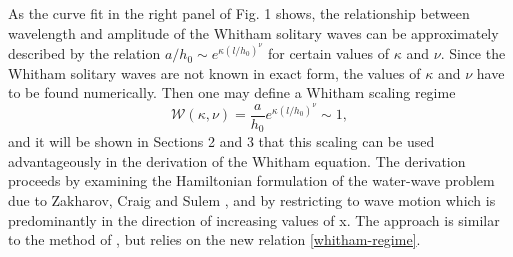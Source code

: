 As the curve fit in the right panel of Fig. 1 shows, the relationship
between wavelength and amplitude of the Whitham solitary
waves can be approximately described by the relation $a/h_0 \sim e^{\kappa(l/h_0)^{\nu}}$ for certain values of $\kappa$ and $\nu$. Since the Whitham solitary
waves are not known in exact form, the values of $\kappa$ and $\nu$ have to be
found numerically. Then one may define a Whitham scaling regime
%
\begin{equation}
	\mathcal{W}(\kappa, \nu) = \frac{a}{h_0}e^{\kappa(l/h_0)^{\nu}} \sim 1,
	\label{whitham-regime}
\end{equation}
%
and it will be shown in Sections 2 and 3 that this scaling can be used
advantageously in the derivation of the Whitham equation. The
derivation proceeds by examining the Hamiltonian formulation of
the water-wave problem due to Zakharov, Craig and Sulem \citep{Craig1993, Zakharov1968},
and by restricting to wave motion which is predominantly in the
direction of increasing values of x. The approach is similar to the
method of \cite{Craig1994}, but relies on the new relation \eqref{whitham-regime}.


